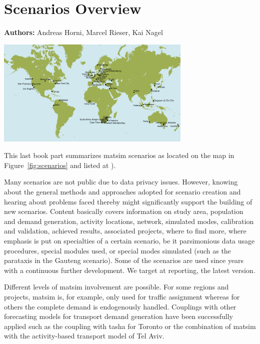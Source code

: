 \chapter{Scenarios Overview}
\label{ch:scenarios}

\hfill \textbf{Authors:} Andreas Horni, Marcel Rieser, Kai Nagel

\begin{center} \includegraphics[width=0.7\textwidth, angle=0]{using/figures/MATSimModelsMap} \end{center}

This last book part summarizes \gls{matsim} scenarios as located on the map in Figure~\ref{fig:scenarios} and listed at \citet[][]{MATSIM-Scenarios_Webpage_2015}).

Many scenarios are not public due to data privacy issues. However, knowing about the general methods and approaches adopted for scenario creation and hearing about problems faced thereby might significantly support the building of new scenarios. Content basically covers information on study area, population and demand generation, activity locations, network, simulated modes, calibration and validation, achieved results, associated projects, where to find more, where emphasis is put on specialties of a certain scenario, be it parsimonious data usage procedures, special modules used, or special modes simulated (such as the parataxis in the Gauteng scenario). Some of the scenarios are used since years with a continuous further development. We target at reporting, the latest version. 

Different levels of \gls{matsim} involvement are possible. For some regions and projects, \gls{matsim} is, for example, only used for traffic assignment whereas for others the complete demand is endogenously handled. Couplings with other forecasting models for transport demand generation have been successfully applied such as the coupling with \gls{tasha} for Toronto or the combination of \gls{matsim} with the activity-based transport model of Tel Aviv.

